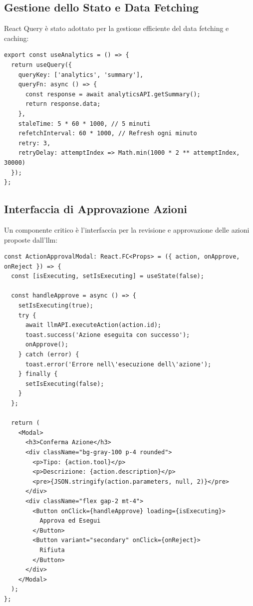 \subsection{Gestione dello Stato e Data Fetching}
React Query è stato adottato per la gestione efficiente del data fetching e caching:

\begin{listing}[H]
\begin{verbatim}
export const useAnalytics = () => {
  return useQuery({
    queryKey: ['analytics', 'summary'],
    queryFn: async () => {
      const response = await analyticsAPI.getSummary();
      return response.data;
    },
    staleTime: 5 * 60 * 1000, // 5 minuti
    refetchInterval: 60 * 1000, // Refresh ogni minuto
    retry: 3,
    retryDelay: attemptIndex => Math.min(1000 * 2 ** attemptIndex, 30000)
  });
};
\end{verbatim}
\caption{Hook per il recupero dati con React Query}
\label{listing:use-analytics-hook}
\end{listing}

\subsection{Interfaccia di Approvazione Azioni}
Un componente critico è l'interfaccia per la revisione e approvazione delle azioni proposte dall'\gls{llm}:

\begin{listing}[H]
\begin{verbatim}
const ActionApprovalModal: React.FC<Props> = ({ action, onApprove, onReject }) => {
  const [isExecuting, setIsExecuting] = useState(false);
  
  const handleApprove = async () => {
    setIsExecuting(true);
    try {
      await llmAPI.executeAction(action.id);
      toast.success('Azione eseguita con successo');
      onApprove();
    } catch (error) {
      toast.error('Errore nell\'esecuzione dell\'azione');
    } finally {
      setIsExecuting(false);
    }
  };
  
  return (
    <Modal>
      <h3>Conferma Azione</h3>
      <div className="bg-gray-100 p-4 rounded">
        <p>Tipo: {action.tool}</p>
        <p>Descrizione: {action.description}</p>
        <pre>{JSON.stringify(action.parameters, null, 2)}</pre>
      </div>
      <div className="flex gap-2 mt-4">
        <Button onClick={handleApprove} loading={isExecuting}>
          Approva ed Esegui
        </Button>
        <Button variant="secondary" onClick={onReject}>
          Rifiuta
        </Button>
      </div>
    </Modal>
  );
};
\end{verbatim}
\caption{Componente di approvazione azioni}
\label{listing:action-approval}
\end{listing}

